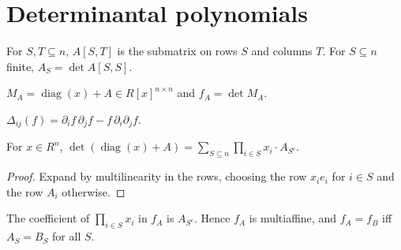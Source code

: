 
\chapter{Determinantal polynomials}

\begin{definition}
\label{def:principal-minor}
\leanok
For $S,T\subseteq n$, $A[S,T]$ is the submatrix on rows $S$ and columns $T$.
For $S\subseteq n$ finite, $A_S=\det A[S,S]$.
\end{definition}

\begin{definition}
\label{def:detpoly}
\leanok
$M_A=\operatorname{diag}(x)+A\in R[x]^{n\times n}$ and $f_A=\det M_A$.
\end{definition}

\begin{definition}
\label{def:rayleigh}
\leanok
$\Delta_{ij}(f)=\partial_i f\,\partial_j f-f\,\partial_i\partial_j f$.
\end{definition}

\begin{theorem}
\label{thm:det-diagonal-add}
\leanok
{}
For $x\in R^n$, $\det(\operatorname{diag}(x)+A)=\sum_{S\subseteq n}\prod_{i\in S}x_i\cdot A_{S^c}$.
\end{theorem}

\begin{proof}
\leanok
Expand by multilinearity in the rows, choosing the row $x_ie_i$ for $i\in S$ and the row
$A_i$ otherwise.
\end{proof}

\begin{corollary}[Coefficients of $f_A$]
\label{cor:coeff-detpoly}
\leanok
{}
The coefficient of $\prod_{i\in S}x_i$ in $f_A$ is $A_{S^c}$. Hence $f_A$ is multiaffine, and
$f_A=f_B$ iff $A_S=B_S$ for all $S$.
\end{corollary}

